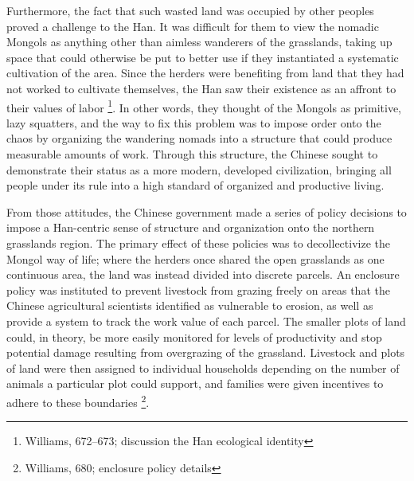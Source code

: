 Furthermore, the fact that such wasted land was occupied by other
peoples proved a challenge to the Han. It was difficult for them to
view the nomadic Mongols as anything other than aimless wanderers of
the grasslands, taking up space that could otherwise be put to better
use if they instantiated a systematic cultivation of the area. Since the
herders were benefiting from land that they had not worked to
cultivate themselves, the Han saw their existence as an affront to their values
of labor \footnote{Williams, 672--673; discussion the Han ecological
identity}. In other words, they thought of the Mongols as primitive,
lazy squatters, and the way to fix this problem was to impose order
onto the
chaos by organizing the wandering nomads into a structure that could
produce measurable amounts of work. Through this structure, the
Chinese sought to demonstrate their status as a more modern, developed
civilization, bringing all people under its rule into a high standard
of organized and productive living.

From those attitudes, the Chinese government made a series of policy decisions to
impose a Han-centric sense of structure and organization onto the
northern grasslands region. The primary effect of these policies was to
decollectivize the Mongol way of life; where the herders once shared
the open grasslands as one continuous area, the land was instead
divided into discrete parcels.  An enclosure policy was instituted to
prevent livestock from grazing freely on areas that the Chinese
agricultural scientists identified as vulnerable to erosion, as well as provide a system to track the work value of each parcel. 
The smaller plots of land could, in theory, be more easily monitored
for levels of productivity and stop potential damage resulting from
overgrazing of the grassland. Livestock and plots of land were then assigned
to individual households depending on the number of animals a
particular plot could support, and families were given incentives to adhere to
these boundaries \footnote{Williams, 680; enclosure policy details}.

